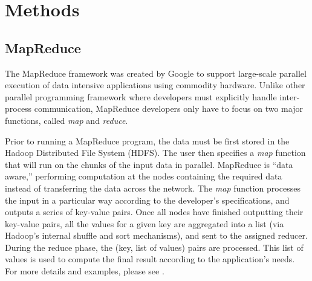 %
\section{Methods}


\subsection{MapReduce}
The MapReduce framework was created by Google to support large-scale parallel execution of data intensive applications using commodity hardware\cite{dean2008mapreduce}.
Unlike other parallel programming framework where developers must explicitly handle inter-process communication, MapReduce developers only have to focus on two major functions, called \emph{map} and \emph{reduce}.

Prior to running a MapReduce program, the data must be first stored in the Hadoop Distributed File System (HDFS).
The user then specifies a \emph{map} function that will run on the chunks of the input data in parallel.
MapReduce is ``data aware,'' performing computation at the nodes containing the required data instead of transferring the data across the network.
The \emph{map} function processes the input in a particular way according to the developer’s specifications, and outputs a series of key-value pairs. Once all nodes have finished outputting their key-value pairs, all the values for a given key are aggregated into a list (via Hadoop's internal shuffle and sort mechanisms), and sent to the assigned reducer. During the reduce phase, the (key, list of values) pairs are processed. This list of values is used to compute the final result according to the application’s needs.
For more details and examples, please see \cite{dean2008mapreduce}.

